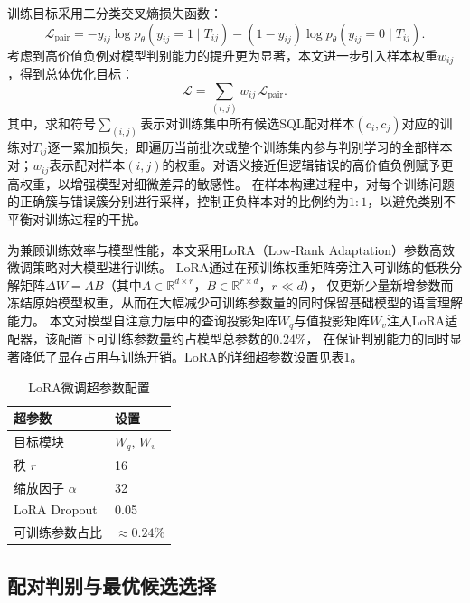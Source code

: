 训练目标采用二分类交叉熵损失函数：
\begin{equation}
\mathcal{L}_{\text{pair}}
=
-y_{ij}\log p_{\theta}(y_{ij}=1\mid T_{ij})
-(1-y_{ij})\log p_{\theta}(y_{ij}=0\mid T_{ij}).
\end{equation}
考虑到高价值负例对模型判别能力的提升更为显著，本文进一步引入样本权重$w_{ij}$，得到总体优化目标：
\begin{equation}
\mathcal{L}
=
\sum_{(i,j)} w_{ij}\,\mathcal{L}_{\text{pair}}.
\end{equation}
其中，求和符号$\sum_{(i,j)}$表示对训练集中所有候选SQL配对样本$(c_i,c_j)$对应的训练对$T_{ij}$逐一累加损失，即遍历当前批次或整个训练集内参与判别学习的全部样本对；$w_{ij}$表示配对样本$(i,j)$的权重。对语义接近但逻辑错误的高价值负例赋予更高权重，以增强模型对细微差异的敏感性。
在样本构建过程中，对每个训练问题的正确簇与错误簇分别进行采样，控制正负样本对的比例约为$1:1$，以避免类别不平衡对训练过程的干扰。

为兼顾训练效率与模型性能，本文采用LoRA（Low-Rank Adaptation）\cite{hu2022lora}参数高效微调策略对大模型进行训练。
LoRA通过在预训练权重矩阵旁注入可训练的低秩分解矩阵$\Delta W = AB$（其中$A \in \mathbb{R}^{d \times r}$，$B \in \mathbb{R}^{r \times d}$，$r \ll d$），
仅更新少量新增参数而冻结原始模型权重，从而在大幅减少可训练参数量的同时保留基础模型的语言理解能力。
本文对模型自注意力层中的查询投影矩阵$W_q$与值投影矩阵$W_v$注入LoRA适配器，该配置下可训练参数量约占模型总参数的$0.24\%$，
在保证判别能力的同时显著降低了显存占用与训练开销。LoRA的详细超参数设置见表\ref{tab:lora_config}。

\begin{table}[htbp]
	\setlength{\abovecaptionskip}{5pt}
	\setlength{\belowcaptionskip}{5pt}
	\caption{LoRA微调超参数配置}
	\centering
	\begin{tabular}{ll}
		\toprule
		超参数 & 设置 \\
		\midrule
		目标模块 & $W_q$, $W_v$ \\
		秩 $r$ & 16 \\
		缩放因子 $\alpha$ & 32 \\
		LoRA Dropout & 0.05 \\
		可训练参数占比 & $\approx 0.24\%$ \\
		\bottomrule
	\end{tabular}
	\label{tab:lora_config}
\end{table}

\subsection{配对判别与最优候选选择}

